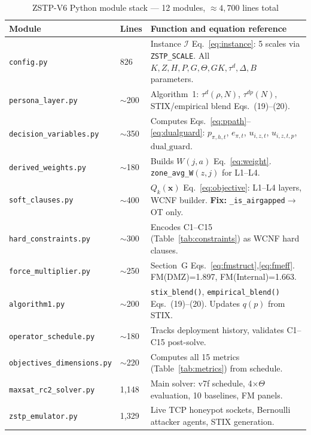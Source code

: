\documentclass[12pt,a4paper]{article}
\newcommand{\hdrt}[1]{\cellcolor{TealDark}\color{white}\bfseries #1}
\newcommand{\xvec}{\mathbf{x}}
\newcommand{\Qkx}{Q_k(\xvec)}
\newcommand{\dg}{\mathrm{dual\_guard}}
\newcommand{\taud}{\tau^d}
\newcommand{\taudp}{\tau^{dp}}
\begin{document}
\begin{table}[H]
\centering
\small
\caption{ZSTP-V6 Python module stack — 12 modules, ${\approx}4{,}700$ lines total}
\label{tab:stack}
\renewcommand{\arraystretch}{1.3}
\begin{tabularx}{\linewidth}{L{2.8cm} C{1.4cm} X}
\toprule
\hdrt{Module} & \hdrt{Lines} & \hdrt{Function and equation reference} \\
\midrule
{}\texttt{config.py} & 826 & Instance $\mathcal{I}$ Eq.~\eqref{eq:instance}: 5 scales via \texttt{ZSTP\_SCALE}. All $K,Z,H,P,G,\Theta,GK,\taud,\Delta,B$ parameters. \\
\texttt{persona\_layer.py} & ${\sim}$200 & Algorithm~1: $\taud(\rho,N)$, $\taudp(N)$, STIX/empirical blend Eqs.~(19)--(20). \\
\texttt{decision\_variables.py} & ${\sim}$350 & Computes Eqs.~\eqref{eq:ppath}--\eqref{eq:dualguard}: $p_{\pi,h,t}$, $e_{\pi,t}$, $u_{i,z,t}$, $u_{i,z,t,p}$, $\dg$. \\
\texttt{derived\_weights.py} & ${\sim}$180 & Builds $W(j,a)$ Eq.~\eqref{eq:weight}. \texttt{zone\_avg\_W}$(z,j)$ for L1--L4. \\
\texttt{soft\_clauses.py} & ${\sim}$400 & $\Qkx$ Eq.~\eqref{eq:objective}: L1--L4 layers, WCNF builder. \textbf{Fix:} \texttt{\_is\_airgapped}$\to$OT only. \\
\texttt{hard\_constraints.py} & ${\sim}$300 & Encodes C1--C15 (Table~\ref{tab:constraints}) as WCNF hard clauses. \\
\texttt{force\_multiplier.py} & ${\sim}$250 & Section~G Eqs.~\eqref{eq:fmstruct},\eqref{eq:fmeff}. FM(DMZ)=1.897, FM(Internal)=1.663. \\
\texttt{algorithm1.py} & ${\sim}$200 & \texttt{stix\_blend()}, \texttt{empirical\_blend()} Eqs.~(19)--(20). Updates $q(p)$ from STIX. \\
\texttt{operator\_schedule.py} & ${\sim}$180 & Tracks deployment history, validates C1--C15 post-solve. \\
\texttt{objectives\_dimensions.py} & ${\sim}$220 & Computes all 15 metrics (Table~\ref{tab:metrics}) from schedule. \\
\texttt{maxsat\_rc2\_solver.py} & 1,148 & Main solver: v7f schedule, 4$\times\Theta$ evaluation, 10 baselines, FM panels. \\
\texttt{zstp\_emulator.py} & 1,329 & Live TCP honeypot sockets, Bernoulli attacker agents, STIX generation. \\
\bottomrule
\end{tabularx}
\end{table}
\end{document}
